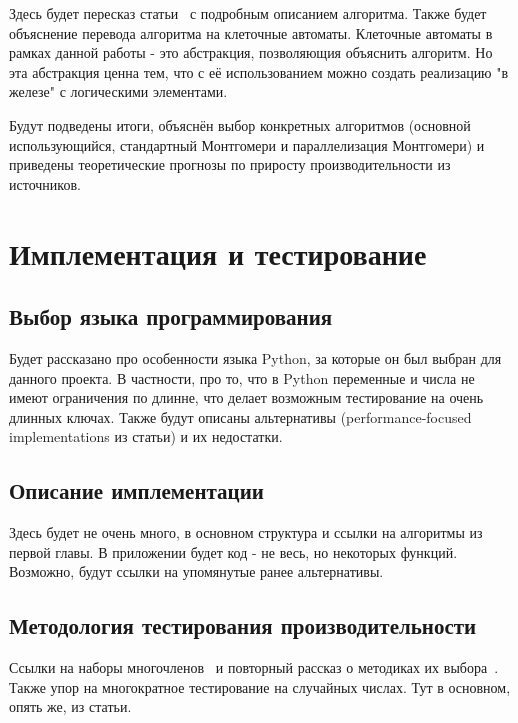 \documentclass[times,specification,annotation]{itmo-student-thesis}
\begin{document}
Здесь будет пересказ статьи~\cite{ku04} с подробным описанием алгоритма.
Также будет объяснение перевода алгоритма на клеточные автоматы.
Клеточные автоматы в рамках данной работы - это абстракция, позволяющия объяснить алгоритм.
Но эта абстракция ценна тем, что с её использованием можно создать реализацию "в железе" с логическими элементами.

\finishrelatedwork
\chapterconclusion

Будут подведены итоги, объяснён выбор конкретных алгоритмов (основной использующийся, стандартный
Монтгомери и параллелизация Монтгомери) и приведены теоретические прогнозы по приросту производительности
из источников.

\chapter{Имплементация и тестирование}

\section{Выбор языка программирования}\label{sec:prog}

Будет рассказано про особенности языка Python, за которые он был выбран для данного проекта.
В частности, про то, что в Python переменные и числа не имеют ограничения по длинне, что делает
возможным тестирование на очень длинных ключах.
Также будут описаны альтернативы (performance-focused implementations из статьи) и их недостатки.

\section{Описание имплементации}\label{sec:impl}

Здесь будет не очень много, в основном структура и ссылки на алгоритмы из первой главы.
В приложении будет код - не весь, но некоторых функций.
Возможно, будут ссылки на упомянутые ранее альтернативы.

\section{Методология тестирования производительности}\label{sec:meth}

Ссылки на наборы многочленов~\cite{rfc7296, rfc3526} и повторный рассказ о методиках их выбора~\cite{rfc2412}.
Также упор на многократное тестирование на случайных числах.
Тут в основном, опять же, из статьи.
\end{document}
